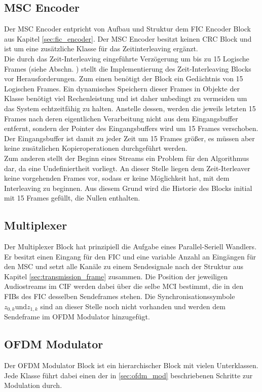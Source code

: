 \subsection{MSC Encoder}
Der MSC Encoder entpricht von Aufbau und Struktur dem FIC Encoder Block aus Kapitel \ref{sec:fic_encoder}. Der MSC Encoder besitzt keinen CRC Block und ist um eine zusätzliche Klasse für das Zeitinterleaving ergänzt.\\
Die durch das Zeit-Interleaving eingeführte Verzögerung um bis zu 15 Logische Frames (siehe Abschn. \label{sec:time_interleaving_std}) stellt die Implementierung des Zeit-Interleaving Blocks vor Herausforderungen. Zum einen benötigt der Block ein Gedächtnis von 15 Logischen Frames. Ein dynamisches Speichern dieser Frames in Objekte der Klasse benötigt viel Rechenleistung und ist daher unbedingt zu vermeiden um das System echtzeitfähig zu halten. Anstelle dessen, werden die jeweils letzten 15 Frames nach deren eigentlichen Verarbeitung nicht aus dem Eingangsbuffer entfernt, sondern der Pointer des Eingangsbuffers wird um 15 Frames verschoben. Der Eingangsbuffer ist damit zu jeder Zeit um 15 Frames größer, es müssen aber keine zusätzlichen Kopieroperationen durchgeführt werden.\\
Zum anderen stellt der Beginn eines Streams ein Problem für den Algorithmus dar, da eine Undefiniertheit vorliegt. An dieser Stelle liegen dem Zeit-Iterleaver keine vorgehenden Frames vor, sodass er keine Möglichkeit hat, mit dem Interleaving zu beginnen. Aus diesem Grund wird die Historie des Blocks initial mit 15 Frames gefüllt, die Nullen enthalten. 

\subsection{Multiplexer}
Der Multiplexer Block hat prinzipiell die Aufgabe eines Parallel-Seriell Wandlers. Er besitzt einen Eingang für den FIC und eine variable Anzahl an Eingängen für den MSC und setzt alle Kanäle zu einem Sendesignale nach der Struktur aus Kapitel \ref{sec:transmission_frame} zusammen. Die Position der jeweiligen Audiostreams im CIF werden dabei über die selbe MCI bestimmt, die in den FIBs des FIC desselben Sendeframes stehen. Die Synchronisationssymbole $z_{0,k} \text{und} z_{1,k}$ sind an dieser Stelle noch nicht vorhanden und werden dem Sendeframe im OFDM Modulator hinzugefügt.

\subsection{OFDM Modulator}
Der OFDM Modulator Block ist ein hierarchischer Block mit vielen Unterklassen. Jede Klasse führt dabei einen der in \ref{sec:ofdm_mod} beschriebenen Schritte zur Modulation durch.

